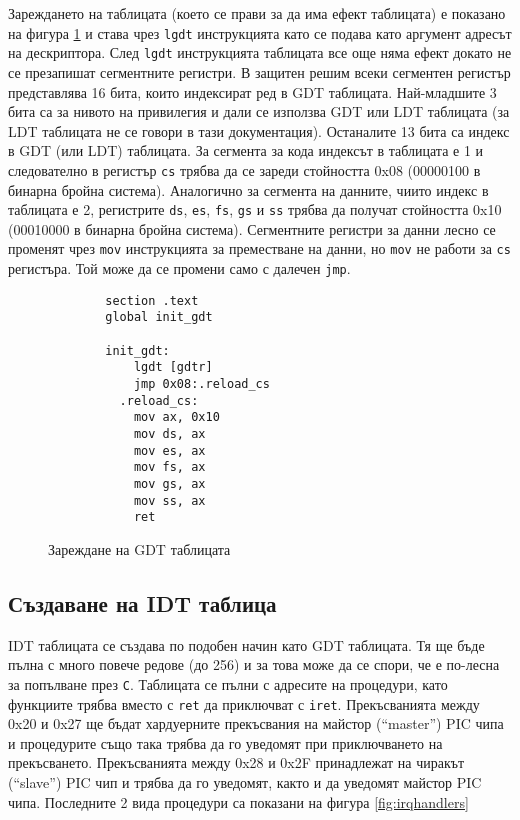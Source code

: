   Зареждането на таблицата (което се прави за да има ефект таблицата) е показано на фигура \ref{fig:lgdt} и става чрез {\tt lgdt} инструкцията като се подава като аргумент адресът на дескриптора. След {\tt lgdt} инструкцията таблицата все още няма ефект докато не се презапишат сегментните регистри. В защитен решим всеки сегментен регистър представлява 16 бита, които индексират ред в GDT таблицата. Най-младшите 3 бита са за нивото на привилегия и дали се използва GDT или LDT таблицата (за LDT таблицата не се говори в тази документация). Останалите 13 бита са индекс в GDT (или LDT) таблицата. За сегмента за кода индексът в таблицата е 1 и следователно в регистър {\tt cs} трябва да се зареди стойността 0x08 (00000100 в бинарна бройна система). Аналогично за сегмента на данните, чиито индекс в таблицата е 2, регистрите {\tt ds}, {\tt es}, {\tt fs}, {\tt gs} и {\tt ss} трябва да получат стойността 0x10 (00010000 в бинарна бройна система). Сегментните регистри за данни лесно се променят чрез {\tt mov} инструкцията за преместване на данни, но {\tt mov} не работи за {\tt cs} регистъра. Той може да се промени само с далечен {\tt jmp}.

    \begin{figure}[ht]
      \centering
      \begin{verbatim}
        section .text
        global init_gdt

        init_gdt:
            lgdt [gdtr]
            jmp 0x08:.reload_cs
          .reload_cs:
            mov ax, 0x10
            mov ds, ax
            mov es, ax
            mov fs, ax
            mov gs, ax
            mov ss, ax
            ret
      \end{verbatim}
      \caption{Зареждане на GDT таблицата}
      \label{fig:lgdt}
    \end{figure}

  \subsection{Създаване на IDT таблица}
  IDT таблицата се създава по подобен начин като GDT таблицата. Тя ще бъде пълна с много повече редове (до 256) и за това може да се спори, че е по-лесна за попълване през {\tt C}. Таблицата се пълни с адресите на процедури, като функциите трябва вместо с {\tt ret} да приключват с {\tt iret}. Прекъсванията между 0x20 и 0x27 ще бъдат хардуерните прекъсвания на майстор (``master'') PIC чипа и процедурите също така трябва да го уведомят при приключването на прекъсването. Прекъсванията между 0x28 и 0x2F принадлежат на чиракът (``slave'') PIC чип и трябва да го уведомят, както и да уведомят майстор PIC чипа. Последните 2 вида процедури са показани на фигура \ref{fig:irqhandlers}

